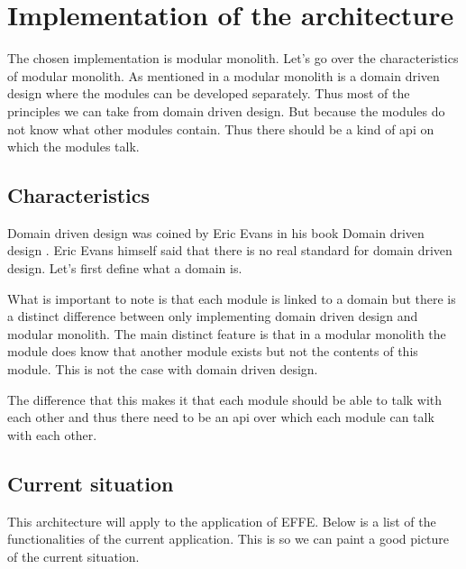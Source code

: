\chapter{Implementation of the architecture}

The chosen implementation is modular monolith. Let’s go over the characteristics of modular monolith. As mentioned in  a modular monolith is a domain driven design where the modules can be developed separately. Thus most of the principles we can take from domain driven design. But because the modules do not know what other modules contain. Thus there should be a kind of api on which the modules talk.

\section{Characteristics}

Domain driven design was coined by Eric Evans in his book Domain driven design \cite{domainDrivenDesign}. Eric Evans himself said that there is no real standard for domain driven design. Let’s first define what a domain is.


What is important to note is that each module is linked to a domain but there is a distinct difference between only implementing domain driven design and modular monolith. The main distinct feature is that in a modular monolith the module does know that another module exists but not the contents of this module. This is not the case with domain driven design.

The difference that this makes it that each module should be able to talk with each other and thus there need to be an api over which each module can talk with each other.

\section{Current situation}

This architecture will apply to the application of EFFE. Below is a list of the functionalities of the current application. This is so we can paint a good picture of the current situation.


